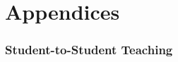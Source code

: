 \part{Appendices}
\appendix
{}%
\captionsetup{list=no}%

\clearpage
\section{Student-to-Student Teaching}
\newpage

% 
 